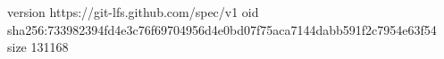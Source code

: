 version https://git-lfs.github.com/spec/v1
oid sha256:733982394fd4e3c76f69704956d4e0bd07f75aca7144dabb591f2c7954e63f54
size 131168
